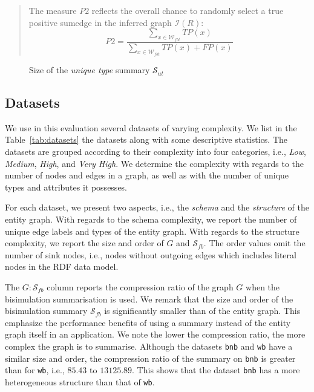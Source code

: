\begin{quotation}
	The measure $P2$ reflects the overall chance to randomly select a true positive sumedge in the inferred graph $\mathcal{I}(R)$:
	$$
	P2 = \frac{\sum_{x \in \mathcal{W}_{fbt}}{TP(x)}}{\sum_{x \in \mathcal{W}_{fbt}}{TP(x) + FP(x)}}
	$$
\end{quotation}

\begin{figure}
	\centering
	\resizebox{.8\textwidth}{!}{
		
	}
	\caption{Size of the \emph{unique type} summary $\mathcal{S}_{ut}$}
	\label{fig:unique-type-summary-size}
\end{figure}
\subsection{Datasets}
\label{sec:eval:datasets}

We use in this evaluation several datasets of varying complexity. We list in the Table~\ref{tab:datasets} the datasets along with some descriptive statistics. The datasets are grouped according to their complexity into four categories, i.e., \emph{Low}, \emph{Medium}, \emph{High}, and \emph{Very High}. We determine the complexity with regards to the number of nodes and edges in a graph, as well as with the number of unique types and attributes it possesses.

For each dataset, we present two aspects, i.e., the \emph{schema} and the \emph{structure} of the entity graph. With regards to the schema complexity, we report the number of unique edge labels and types of the entity graph. With regards to the structure complexity, we report the size and order of $G$ and  $\mathcal{S}_{fb}$. The order values omit the number of sink nodes, i.e., nodes without outgoing edges which includes literal nodes in the RDF data model.

The $G:\mathcal{S}_{fb}$ column reports the compression ratio of the graph $G$ when the bisimulation summarisation is used. We remark that the size and order of the bisimulation summary $\mathcal{S}_{fb}$ is significantly smaller than of the entity graph. This emphasize the performance benefits of using a summary instead of the entity graph itself in an application. We note the lower the compression ratio, the more complex the graph is to summarise. Although the datasets \texttt{bnb} and \texttt{wb} have a similar size and order, the compression ratio of the summary on \texttt{bnb} is greater than for \texttt{wb}, i.e., $85.43$ to $13125.89$. This shows that the dataset \texttt{bnb} has a more heterogeneous structure than that of \texttt{wb}.


